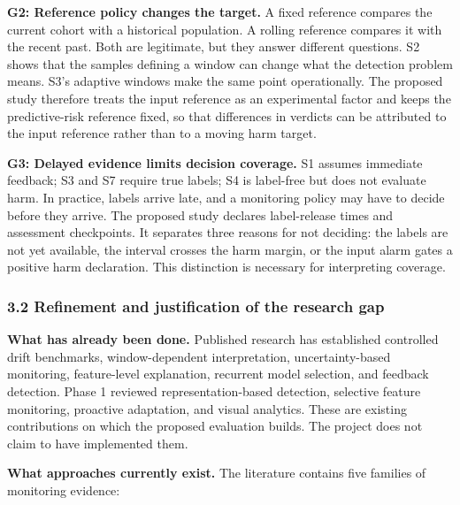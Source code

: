 \documentclass[
]{article}
\begin{document}
\textbf{G2: Reference policy changes the target.} A fixed reference
compares the current cohort with a historical population. A rolling
reference compares it with the recent past. Both are legitimate, but
they answer different questions. S2 shows that the samples defining a
window can change what the detection problem means. S3's adaptive
windows make the same point operationally. The proposed study therefore
treats the input reference as an experimental factor and keeps the
predictive-risk reference fixed, so that differences in verdicts can be
attributed to the input reference rather than to a moving harm target.

\textbf{G3: Delayed evidence limits decision coverage.} S1 assumes
immediate feedback; S3 and S7 require true labels; S4 is label-free but
does not evaluate harm. In practice, labels arrive late, and a
monitoring policy may have to decide before they arrive. The proposed
study declares label-release times and assessment checkpoints. It
separates three reasons for not deciding: the labels are not yet
available, the interval crosses the harm margin, or the input alarm
gates a positive harm declaration. This distinction is necessary for
interpreting coverage.

\hypertarget{refinement-and-justification-of-the-research-gap}{%
\subsubsection{3.2 Refinement and justification of the research
gap}\label{refinement-and-justification-of-the-research-gap}}

\textbf{What has already been done.} Published research has established
controlled drift benchmarks, window-dependent interpretation,
uncertainty-based monitoring, feature-level explanation, recurrent model
selection, and feedback detection. Phase 1 reviewed representation-based
detection, selective feature monitoring, proactive adaptation, and
visual analytics. These are existing contributions on which the proposed
evaluation builds. The project does not claim to have implemented them.

\textbf{What approaches currently exist.} The literature contains five
families of monitoring evidence:
\end{document}
